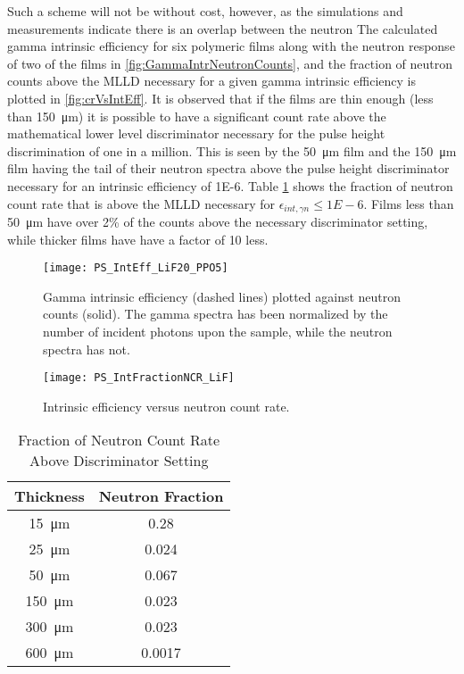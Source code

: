 Such a scheme will not be without cost, however, as the simulations and measurements indicate there is an overlap between the neutron 
The calculated gamma intrinsic efficiency for six polymeric films along with the neutron response of two of the films in \autoref{fig:GammaIntrNeutronCounts}, and the fraction of neutron counts above the MLLD necessary for a given gamma intrinsic efficiency is plotted in \autoref{fig:crVsIntEff}.
It is observed that if the films are thin enough (less than \SI{150}{\um}) it is possible to have a significant count rate above the mathematical lower level discriminator necessary for the pulse height discrimination of one in a million.
This is seen by the \SI{50}{\um} film and the \SI{150}{\um} film having the tail of their neutron spectra above the pulse height discriminator necessary for an intrinsic efficiency of \num{1E-6}.
Table \ref{tab:FractionCRGamma} shows the fraction of neutron count rate that is above the MLLD necessary for $\epsilon_{int,\gamma n} \le \si{1E-6}$.
Films less than \SI{50}{\um} have over 2\% of the counts above the necessary discriminator setting, while thicker films have have a factor of 10 less.
\begin{figure}[ht]
    \centering
    \texttt{[image: PS\_IntEff\_LiF20\_PPO5]}
    \caption[PS Gamma intrinsic efficiency and neutron count rate]{Gamma intrinsic efficiency (dashed lines) plotted against neutron counts (solid). The gamma spectra has been normalized by the number of incident photons upon the sample, while the neutron spectra has not.}
    \label{fig:GammaIntrNeutronCounts}
\end{figure}
\begin{figure}[ht]
    \centering
    \texttt{[image: PS\_IntFractionNCR\_LiF]}
    \caption{Intrinsic efficiency versus neutron count rate. }
    \label{fig:crVsIntEff}
\end{figure}
\begin{table}[]
    \caption{Fraction of Neutron Count Rate Above Discriminator Setting}
	\centering
	\begin{tabular}{c | c}
	Thickness & Neutron Fraction \\
	\hline
	\hline
	\SI{15}{\um} & 0.28 \\
	\SI{25}{\um} & 0.024 \\
	\SI{50}{\um}  & 0.067 \\
	\SI{150}{\um}  & 0.023 \\
	\SI{300}{\um}  & 0.023 \\
	\SI{600}{\um}  & 0.0017 \\
	\end{tabular}
  \label{tab:FractionCRGamma}
\end{table}
